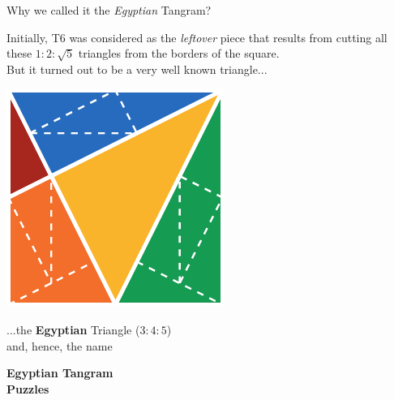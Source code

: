 \documentclass[14pt]{beamer}
\begin{document}
    \begin{frame}{Why we called it the \emph{Egyptian} Tangram?}
        \begin{center}
            {\small Initially, T6 was considered as the \emph{leftover} piece that results from cutting all these $1\!\!:\!\!2\!\!:\!\!\sqrt{5}$ triangles from the borders of the square.\\But it turned out to be a very well known triangle...}

            \bigskip \bigskip

            \includegraphics[height=15ex]{figures/figure003a.pdf} \\

            \bigskip \bigskip

            ...the \textbf{Egyptian} Triangle ($3\!\!:\!\!4\!\!:\!\!5$)\\{\small and, hence, the name}
        \end{center}
    \end{frame}


    \begin{frame}{}
        \begin{center}
            \textbf{\Huge Egyptian Tangram\\\bigskip Puzzles}\\
        \end{center}
    \end{frame}

\end{document}
